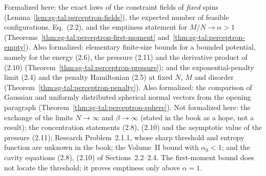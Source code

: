 \begin{remark}\label{rem:sg-tal:perceptron-scope}
Formalized here: the exact laws of the constraint fields of \emph{fixed} spins (Lemma~\ref{lem:sg-tal:perceptron-fields}),
the expected number of feasible configurations, Eq.~(2.2), and the emptiness statement for $M/N\to\alpha>1$
(Theorems~\ref{thm:sg-tal:perceptron-first-moment} and~\ref{thm:sg-tal:perceptron-empty}).
Also formalized: elementary finite-size bounds for a bounded potential, namely for the energy (2.6), the
pressure (2.11) and the derivative product of (2.10) (Theorem~\ref{thm:sg-tal:perceptron-pressure}); and the
exponential-penalty limit (2.4) and the penalty Hamiltonian (2.5) at fixed $N$, $M$ and disorder
(Theorem~\ref{thm:sg-tal:perceptron-penalty}).
Also formalized: the comparison of Gaussian and uniformly distributed spherical normal vectors from the
opening paragraph (Theorem~\ref{thm:sg-tal:perceptron-sphere}).
Not formalized here: the exchange of the limits $N\to\infty$ and $\beta\to\infty$ (stated in the book as a hope, not a result); the
concentration statements (2.8), (2.10) and the asymptotic value of the pressure (2.11);
Research Problem~2.1.1, whose sharp threshold and entropy function are unknown in the book; the Volume~II
bound with $\alpha_0<1$; and the cavity equations (2.8), (2.10) of Sections~2.2--2.4. The first-moment bound
does not locate the threshold; it proves emptiness only above $\alpha=1$.
\end{remark}

